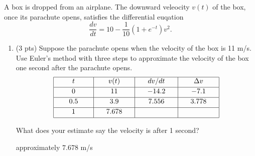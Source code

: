 \documentclass[11pt,letterpaper]{article}
\begin{document}
\begin{enumerate}
A box is dropped from an airplane.  The downward veleocity $v(t)$ of the box, once its parachute opens, satisfies the differential euqation
\[\frac{dv}{dt}=10-\frac{1}{10}(1+e^{-t})v^2.\]
\begin{enumerate}
\item (3 pts)
Suppose the parachute opens when the velocity of the box is 11 m/s.  Use Euler's method with three steps to approximate the velocity of the box one second after the parachute opens.
\[\begin{array}{|c|c|c|c|}
\hline
t & v(t) & dv/dt & \Delta v \\ [0.5ex]
\hline 
\hspace{4ex}0\hspace{4ex} & \hspace{3ex}11\hspace{3ex} & \hspace{3ex}-14.2\hspace{3ex} & \hspace{3ex}-7.1\hspace{3ex} \\ [0.5ex]
\hline
\hspace{4ex}0.5\hspace{4ex} & \hspace{3ex}3.9\hspace{3ex} & \hspace{3ex}7.556\hspace{3ex} & \hspace{3ex}3.778\hspace{3ex} \\ [0.5ex]
\hline 
\hspace{4ex}1\hspace{4ex} & \hspace{3ex}7.678\hspace{3ex} & \hspace{10ex} & \hspace{10ex} \\ [0.5ex]
\hline
\end{array}\]

What does your estimate say the velocity is after 1 second?

approximately $7.678$ m/s

\vspace{1pc}


\end{enumerate}
\end{enumerate}
\end{document}
